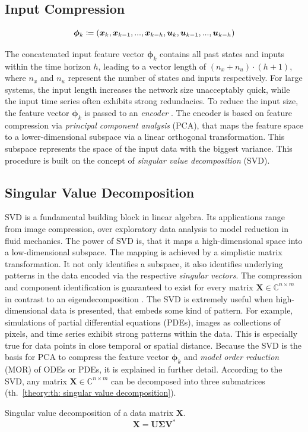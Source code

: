 \subsection{Input Compression}
\begin{equation}
    \label{theory:eq: input feature vector}
    \bm{\phi}_k \coloneq ({\bm{x}}_k, {\bm{x}}_{k-1}, ..., {\bm{x}}_{k-h}, {\bm{u}}_k, {\bm{u}}_{k-1}, ..., {\bm{u}}_{k-h})
\end{equation}

\noindent
The concatenated input feature vector $\bm{\phi}_k$ contains all past states and inputs within the time horizon $h$, leading
to a vector length of $(n_x + n_u) \cdot (h+1)$, where $n_x$ and $n_u$ represent the number of states and inputs respectively. 
For large systems, the input length increases the network size unacceptably quick, while the input time series often exhibits
strong redundacies. To reduce the input size, the feature vector $\bm{\phi}_k$ is passed to an \emph{encoder} \cite{kemmerling2025}.
The encoder is based on feature compression via \emph{principal component analysis} (PCA), that maps the feature space to 
a lower-dimensional subspace via a linear orthogonal transformation. This subspace represents the space of the input data with the biggest variance.
This procedure is built on the concept of \emph{singular value decomposition} (SVD).

\subsection{Singular Value Decomposition}
\label{theory: svd}
SVD is a fundamental building block in linear algebra. Its applications
range from image compression, over exploratory data analysis to model reduction in fluid mechanics.
The power of SVD is, that it maps a high-dimensional space into a low-dimensional subspace. The mapping is achieved by a simplistic matrix
transformation. It not only identifies a subspace, it also identifies underlying patterns in the data encoded
via the respective \emph{singular vectors}. The compression and component identification is guaranteed
to exist for every matrix $\bm{X} \in \mathbb{C}^{n \times m}$ in contrast to an eigendecomposition \cite{Brunton2019}.
\newline
\newline
The SVD is extremely useful when high-dimensional data is presented, that embeds some kind of pattern. For example,
simulations of partial differential equations (PDEs), images as collections of pixels, and time series exhibit strong patterns within the data.
This is especially true for data points in close temporal or spatial distance. Because the SVD is the basis for
PCA to compress the feature vector $\bm{\phi}_k$ and \emph{model order reduction} (MOR) of ODEs
or PDEs, it is explained in further detail. According to the SVD, any matrix $\bm{X} \in \mathbb{C}^{n \times m}$ can be decomposed
into three submatrices (th.~\ref{theory:th: singular value decomposition}).
\begin{theorem} Singular value decomposition of a data matrix $\bm{X}$.
    \label{theory:th: singular value decomposition}
    \[
    \bm{X} = \bm{U} \bm{\Sigma} \bm{V}^*
    \] 
\end{theorem}


